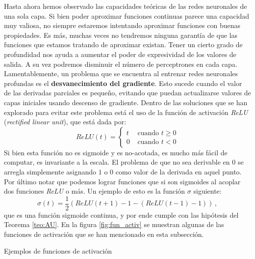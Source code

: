 Hasta ahora hemos observado las capacidades teóricas de las redes neuronales de una sola capa. Si bien poder aproximar funciones continuas parece una capacidad muy valiosa, no siempre estaremos intentando aproximar funciones con buenas propiedades. Es más, muchas veces no tendremos ninguna garantía de que las funciones que estamos tratando de aproximar existan. Tener un cierto grado de profundidad nos ayuda a aumentar el poder de expresividad de los valores de salida. A su vez podremos disminuir el número de perceptrones en cada capa.
\newp Lamentablemente, un problema que se encuentra al entrenar redes neuronales profundas es el \textbf{desvanecimiento del gradiente}. Esto sucede cuando el valor de las derivadas parciales es pequeño, evitando que puedan actualizarse valores de capas iniciales usando descenso de gradiente. Dentro de las soluciones que se han explorado para evitar este problema está el uso de la función de activación \textit{ReLU} (\textit{rectified linear unit}), que está dada por:
$$ ReLU(t) = \begin{cases}
t & \text{ cuando }t\geq0 \\
0 & \text{ cuando }t<0
\end{cases}$$
Si bien esta función no es sigmoide y es no-acotada, es mucho más fácil de computar, es invariante a la escala. El problema de que no sea derivable en $0$ se arregla simplemente asignando $1$ o $0$ como valor de la derivada en aquel punto. Por último notar que podemos lograr funciones que si son sigmoides al acoplar dos funciones \textit{ReLU} o más. Un ejemplo de esto es la función $\sigma$ siguiente:
$$ \sigma(t) = \frac{1}{2}(ReLU(t+1)-1-(ReLU(t-1)-1))\,,$$
que es una función sigmoide continua, y por ende cumple con las hipótesis del Teorema \ref{teo:AU}. En la figura \ref{fig:fun_activ} se muestran algunas de las funciones de activación que se han mencionado en esta subsección.
\begin{images}[\label{fig:fun_activ}]{Ejemplos de funciones de activación}
	\imagesnewline
\end{images}



